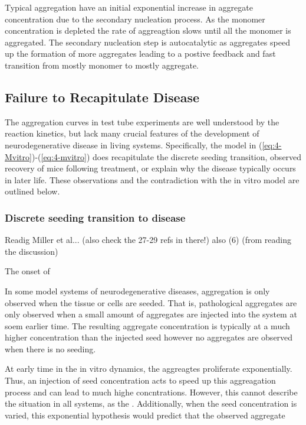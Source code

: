  Typical aggregation have an initial exponential increase in aggregate concentration due to the secondary nucleation process. As the monomer concentration is depleted the rate of aggreagtion slows until all the monomer is aggregated. The secondary nucleation step is autocatalytic as aggregates speed up the formation of more aggregates leading to a postive feedback and fast transition from mostly monomer to mostly aggregate.

\subsection{Failure to Recapitulate Disease}

The aggregation curves in test tube experiments are well understood by the reaction kinetics, but lack many crucial features of the development of neurodegenerative disease in living systems. Specifically, the model in (\ref{eq:4-Mvitro})-(\ref{eq:4-mvitro}) does recapitulate the discrete seeding transition, observed recovery of mice following treatment, or explain why the disease typically occurs in later life. These observations and the contradiction with the in vitro model are outlined below.

\subsubsection{Discrete seeding transition to disease}
Readig Miller et al... (also check the 27-29 refs in there!)
also (6) (from reading the discussion)

The onset of 

In some model systems of neurodegenerative diseases, aggregation is only observed when the tissue or cells are seeded. That is, pathological aggregates are only observed when a small amount of aggregates are injected into the system at soem earlier time. The resulting aggregate concentration is typically at a much higher concentration than the injected seed however no aggregates are observed when there is no seeding.

At early time in the in vitro dynamics, the aggreagtes proliferate exponentially. Thus, an injection of seed concentration acts to speed up this aggreagation process and can lead to much highe concntrations. However, this cannot describe the situation in all systems, as the . Additionally, when the seed concentration is varied, this exponential hypothesis would predict that the observed aggregate


